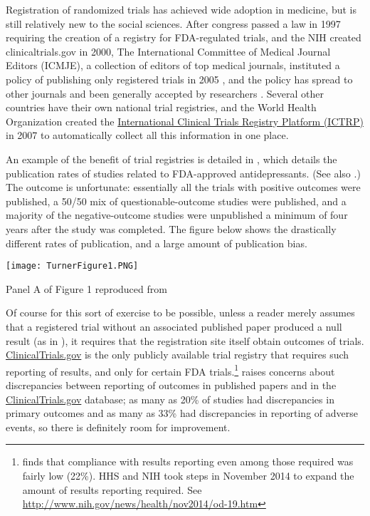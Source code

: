 \documentclass[12pt] {article}
\begin{document}
Registration of randomized trials has achieved wide adoption in medicine, but is still
relatively new to the social sciences. After congress passed a law in
1997 requiring the creation of a registry for FDA-regulated trials, and
the NIH created clinicaltrials.gov in 2000, The International Committee
of Medical Journal Editors (ICMJE), a collection of editors of top
medical journals, instituted a policy of publishing only registered
trials in 2005 \citep{DeAngelis2004}, and the policy has spread to
other journals and been generally accepted by researchers \citep{laine_clinical_2007}. Several other countries have their own national trial registries, and the World Health Organization created the \href{http://www.who.int/ictrp/about/en/}{International Clinical Trials Registry Platform (ICTRP)} in 2007 to automatically collect all this information in one place.

An example of the benefit of trial registries is detailed in
\cite{turner_selective_2008}, which details the publication rates of studies
related to FDA-approved antidepressants. (See also \cite{ioannidis_effectiveness_2008}.)
The outcome is unfortunate:
essentially all the trials with positive outcomes were published, a
50/50 mix of questionable-outcome studies were published, and a majority of the
negative-outcome studies were unpublished a minimum of four years after the
study was completed. The figure below shows the drastically different
rates of publication, and a large amount of publication bias.
\begin{center}
\texttt{[image: TurnerFigure1.PNG]}

Panel A of Figure 1 reproduced from \cite{turner_selective_2008}
\end{center}
Of course for this sort of exercise to be possible, unless a reader
merely assumes that a registered trial without an associated published
paper produced a null result (as in \cite{rosenthal1979file}), it requires that the registration site
itself obtain outcomes of trials. \href{http://www.clinicaltrials.gov}{ClinicalTrials.gov} is the only
publicly available trial registry that requires such reporting of
results, and only for certain FDA trials.\footnote{\cite{resultscompliance} finds that compliance with results reporting even among those required was fairly low (22\%). HHS and NIH took steps in November 2014 to expand the amount of results reporting required. See \url{http://www.nih.gov/news/health/nov2014/od-19.htm}}  \cite{hartung_reporting_2014} raises
concerns about discrepancies between reporting of outcomes in published
papers and in the \href{http://www.clinicaltrials.gov}{ClinicalTrials.gov} database; as many as 20\% of
studies had discrepancies in primary outcomes and as many as 33\% had
discrepancies in reporting of adverse events, so there is definitely room for improvement. 
\end{document}
